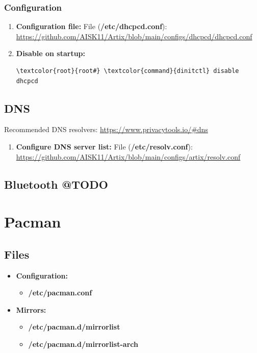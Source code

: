 \documentclass[10pt, a4paper, onecolumn, oneside, titlepage, openany]{book}
\begin{document}
\subsection{Configuration}
\begin{enumerate}
    \item \textbf{Configuration file:}
\newline File (\textbf{\textcolor{file}{/etc/dhcpcd.conf}}):
\newline \url{https://github.com/AISK11/Artix/blob/main/configs/dhcpcd/dhcpcd.conf}
    \item \textbf{Disable on startup:}
\begin{Verbatim}[commandchars=\\\{\}]
\textcolor{root}{root#} \textcolor{command}{dinitctl} disable dhcpcd
\end{Verbatim}
\end{enumerate}

\section{DNS}
Recommended DNS resolvers: \url{https://www.privacytools.io/#dns}
\begin{enumerate}
    \item \textbf{Configure DNS server list:}
\newline File (\textbf{\textcolor{file}{/etc/resolv.conf}}):
\newline \url{https://github.com/AISK11/Artix/blob/main/configs/artix/resolv.conf}
\end{enumerate}

\section{Bluetooth @TODO}


\chapter{Pacman}
\section{Files}
\begin{itemize}
    \item \textbf{Configuration:}
    \begin{itemize}
        \item \textbf{\textcolor{file}{/etc/pacman.conf}}
    \end{itemize}
    \item \textbf{Mirrors:}
    \begin{itemize}
        \item \textbf{\textcolor{file}{/etc/pacman.d/mirrorlist}}
        \item \textbf{\textcolor{file}{/etc/pacman.d/mirrorlist-arch}}
    \end{itemize}
\end{itemize}
\end{document}
